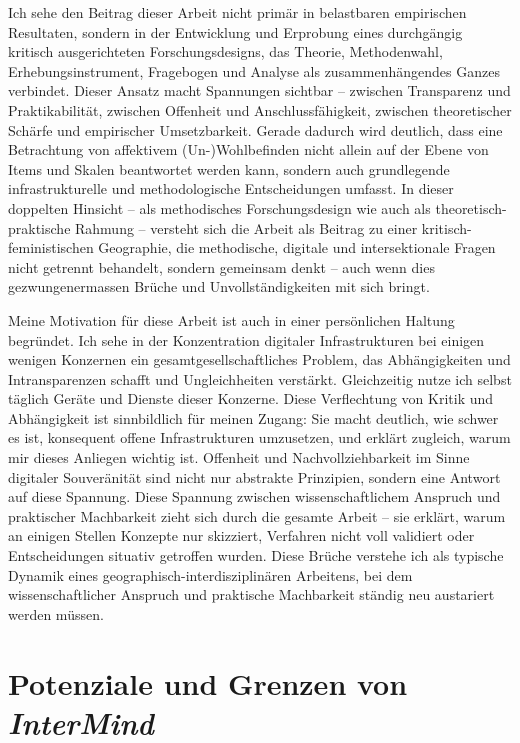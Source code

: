 Ich sehe den Beitrag dieser Arbeit nicht primär in belastbaren empirischen Resultaten, sondern in der Entwicklung und Erprobung eines durchgängig kritisch ausgerichteten Forschungsdesigns, das Theorie, Methodenwahl, Erhebungsinstrument, Fragebogen und Analyse als zusammenhängendes Ganzes verbindet. Dieser Ansatz macht Spannungen sichtbar -- zwischen Transparenz und Praktikabilität, zwischen Offenheit und Anschlussfähigkeit, zwischen theoretischer Schärfe und empirischer Umsetzbarkeit. Gerade dadurch wird deutlich, dass eine  Betrachtung von affektivem (Un-)Wohlbefinden nicht allein auf der Ebene von Items und Skalen beantwortet werden kann, sondern auch grundlegende infrastrukturelle und methodologische Entscheidungen umfasst. In dieser doppelten Hinsicht -- als methodisches Forschungsdesign wie auch als theoretisch-praktische Rahmung -- versteht sich die Arbeit als Beitrag zu einer kritisch-feministischen Geographie, die methodische, digitale und intersektionale Fragen nicht getrennt behandelt, sondern gemeinsam denkt -- auch wenn dies gezwungenermassen Brüche und Unvollständigkeiten mit sich bringt.


Meine Motivation für diese Arbeit ist auch in einer persönlichen Haltung begründet. Ich sehe in der Konzentration digitaler Infrastrukturen bei einigen wenigen Konzernen ein gesamtgesellschaftliches Problem, das Abhängigkeiten und Intransparenzen schafft und Ungleichheiten verstärkt. Gleichzeitig nutze ich selbst täglich Geräte und Dienste dieser Konzerne. Diese Verflechtung von Kritik und Abhängigkeit ist sinnbildlich für meinen Zugang: Sie macht deutlich, wie schwer es ist, konsequent offene Infrastrukturen umzusetzen, und erklärt zugleich, warum mir dieses Anliegen wichtig ist. Offenheit und Nachvollziehbarkeit im Sinne digitaler Souveränität sind nicht nur abstrakte Prinzipien, sondern eine Antwort auf diese Spannung. Diese Spannung zwischen wissenschaftlichem Anspruch und praktischer Machbarkeit zieht sich durch die gesamte Arbeit -- sie erklärt, warum an einigen Stellen Konzepte nur skizziert, Verfahren nicht voll validiert oder Entscheidungen situativ getroffen wurden. Diese Brüche verstehe ich als typische Dynamik eines geographisch-interdisziplinären Arbeitens, bei dem wissenschaftlicher Anspruch und praktische Machbarkeit ständig neu austariert werden müssen.

\section{Potenziale und Grenzen von \textit{InterMind}}

